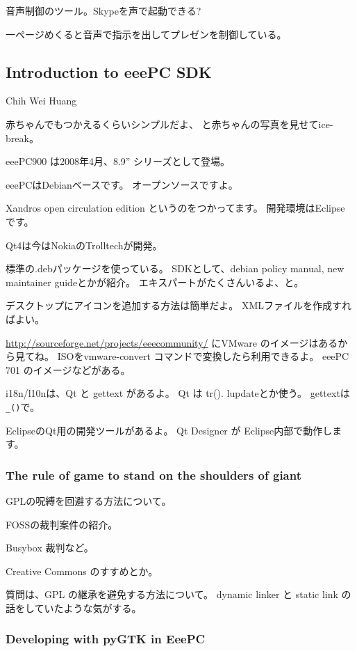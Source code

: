\documentclass[mingoth,a4paper]{jsarticle}
\begin{document}
音声制御のツール。Skypeを声で起動できる?

一ページめくると音声で指示を出してプレゼンを制御している。

\subsection{Introduction to eeePC SDK}

Chih Wei Huang

赤ちゃんでもつかえるくらいシンプルだよ、
と赤ちゃんの写真を見せてice-break。

eeePC900 は2008年4月、8.9'' シリーズとして登場。

eeePCはDebianベースです。
オープンソースですよ。

Xandros open circulation edition というのをつかってます。
開発環境はEclipse です。

Qt4は今はNokiaのTrolltechが開発。


標準の.debパッケージを使っている。
SDKとして、debian policy manual, new maintainer guideとかが紹介。
エキスパートがたくさんいるよ、と。

デスクトップにアイコンを追加する方法は簡単だよ。
XMLファイルを作成すればよい。

\url{http://sourceforge.net/projects/eeecommunity/}
にVMware のイメージはあるから見てね。
ISOをvmware-convert コマンドで変換したら利用できるよ。
eeePC 701 のイメージなどがある。

i18n/l10nは、Qt と gettext があるよ。
Qt は tr().
lupdateとか使う。
gettextは \verb!_()!で。


EclipseのQt用の開発ツールがあるよ。
Qt Designer が Eclipse内部で動作します。


\subsubsection{The rule of game to stand on the shoulders of giant}

GPLの呪縛を回避する方法について。

FOSSの裁判案件の紹介。

Busybox 裁判など。

Creative Commons のすすめとか。

質問は、GPL の継承を避免する方法について。
dynamic linker と static link の話をしていたような気がする。

\subsubsection{Developing with pyGTK in EeePC}
\end{document}
